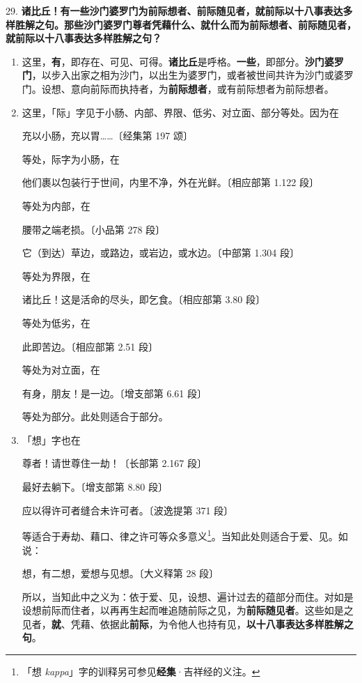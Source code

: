 {\Large 29.} \textbf{诸比丘！有一些沙门婆罗门为前际想者、前际随见者，就前际以十八事表达多样胜解之句。那些沙门婆罗门尊者凭藉什么、就什么而为前际想者、前际随见者，就前际以十八事表达多样胜解之句？}

\begin{enumerate}\item 这里，\textbf{有}，即存在、可见、可得。\textbf{诸比丘}是呼格。\textbf{一些}，即部分。\textbf{沙门婆罗门}，以步入出家之相为沙门，以出生为婆罗门，或者被世间共许为沙门或婆罗门。设想、意向前际而执持者，为\textbf{前际想者}，或有前际想者为前际想者。
\item 这里，「际」字见于小肠、内部、界限、低劣、对立面、部分等处。因为在\begin{quoting}充以小肠，充以胃……{\bluefootnotesize 〔经集第 197 颂〕}\end{quoting}等处，际字为小肠，在\begin{quoting}他们裹以包装行于世间，内里不净，外在光鲜。{\bluefootnotesize 〔相应部第 1.122 段〕}\end{quoting}等处为内部，在\begin{quoting}腰带之端老损。{\bluefootnotesize 〔小品第 278 段〕}\end{quoting}\begin{quoting}它（到达）草边，或路边，或岩边，或水边。{\bluefootnotesize 〔中部第 1.304 段〕}\end{quoting}等处为界限，在\begin{quoting}诸比丘！这是活命的尽头，即乞食。{\bluefootnotesize 〔相应部第 3.80 段〕}\end{quoting}等处为低劣，在\begin{quoting}此即苦边。{\bluefootnotesize 〔相应部第 2.51 段〕}\end{quoting}等处为对立面，在\begin{quoting}有身，朋友！是一边。{\bluefootnotesize 〔增支部第 6.61 段〕}\end{quoting}等处为部分。此处则适合于部分。
\item 「想」字也在\begin{quoting}尊者！请世尊住一劫！{\bluefootnotesize 〔长部第 2.167 段〕}\end{quoting}\begin{quoting}最好去躺下。{\bluefootnotesize 〔增支部第 8.80 段〕}\end{quoting}\begin{quoting}应以得许可者缝合未许可者。{\bluefootnotesize 〔波逸提第 371 段〕}\end{quoting}等适合于寿劫、藉口、律之许可等众多意义\footnote{「想 \textit{kappa}」字的训释另可参见\textbf{经集}·吉祥经的义注。}。当知此处则适合于爱、见。如说：\begin{quoting}想，有二想，爱想与见想。{\bluefootnotesize 〔大义释第 28 段〕}\end{quoting}所以，当知此中之义为：依于爱、见，设想、遍计过去的蕴部分而住。对如是设想前际而住者，以再再生起而唯追随前际之见，为\textbf{前际随见者}。这些如是之见者，\textbf{就}、凭藉、依据此\textbf{前际}，为令他人也持有见，\textbf{以十八事表达多样胜解之句}。

\end{enumerate}
